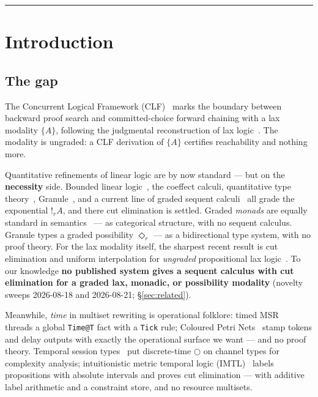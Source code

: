\documentclass[11pt]{article}
\newcommand{\gbang}[1]{{!}_{#1}}                 %
\theoremstyle{definition}
\theoremstyle{remark}
\begin{document}
\tableofcontents
\bigskip\hrule\bigskip

\section{Introduction}

\subsection{The gap}

The Concurrent Logical Framework (CLF)~\cite{Watkins2002CLF} marks the
boundary between backward proof search and committed-choice forward chaining
with a lax modality $\{A\}$, following the judgmental reconstruction of lax
logic~\cite{FairtloughMendler1997,PfenningDavies2001}.  The modality is
ungraded: a CLF derivation of $\{A\}$ certifies reachability and nothing more.

Quantitative refinements of linear logic are by now standard --- but on the
\textbf{necessity} side.  Bounded linear logic~\cite{GirardScedrovScott1992},
the coeffect calculi, quantitative type theory~\cite{Atkey2018},
Granule~\cite{OrchardLiepeltEades2019}, and a current line of graded sequent
calculi~\cite{MoonEadesOrchard2021,VollmerMarshallEadesOrchard2025,HanukaevEades2025}
all grade the exponential $\gbang{r} A$, and there cut elimination is settled.
Graded \emph{monads} are equally standard in
semantics~\cite{Katsumata2014,FujiiKatsumataMillies2016} --- as categorical
structure, with no sequent calculus.  Granule types a graded possibility
$\Diamond_r$ --- as a bidirectional type system, with no proof theory.  For the
lax modality itself, the sharpest recent result is cut elimination and uniform
interpolation for \emph{ungraded} propositional lax logic~\cite{Iemhoff2024}.
To our knowledge \textbf{no published system gives a sequent calculus with cut
elimination for a graded lax, monadic, or possibility modality} (novelty sweeps
2026-08-18 and 2026-08-21; \S\ref{sec:related}).

Meanwhile, \emph{time} in multiset rewriting is operational folklore: timed
MSR~\cite{KanovichFORMATS2016} threads a global \texttt{Time@T} fact with a
\texttt{Tick} rule; Coloured Petri Nets~\cite{Jensen2007CPN} stamp tokens and
delay outputs with exactly the operational surface we want --- and no proof
theory.  Temporal session types~\cite{DasHoffmannPfenning2018} put
discrete-time $\bigcirc$ on channel types for complexity analysis; intuitionistic
metric temporal logic (IMTL)~\cite{deSaToninhoPfenning2023} labels propositions
with absolute intervals and proves cut elimination --- with additive label
arithmetic and a constraint store, and no resource multisets.
\end{document}
